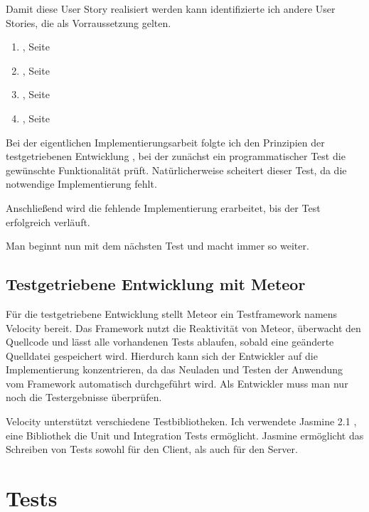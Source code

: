 Damit diese User Story realisiert werden kann identifizierte ich andere User
Stories, die als Vorraussetzung gelten.

\begin{enumerate}
  \item{, Seite \pageref{ch:SystemEntwurf:03}}
  \item{, Seite \pageref{ch:SystemEntwurf:04}}
  \item{, Seite \pageref{ch:SystemEntwurf:05}}
  \item{, Seite \pageref{ch:SystemEntwurf:06}}
\end{enumerate}

Bei der eigentlichen Implementierungsarbeit folgte ich den Prinzipien der
testgetriebenen Entwicklung \cite{tdd}, bei der zunächst ein programmatischer
Test die gewünschte Funktionalität prüft. Natürlicherweise scheitert dieser
Test, da die notwendige Implementierung fehlt.

Anschließend wird die fehlende Implementierung erarbeitet, bis der Test
erfolgreich verläuft.

Man beginnt nun mit dem nächsten Test und macht immer so weiter.

\subsection{Testgetriebene Entwicklung mit Meteor}

Für die testgetriebene Entwicklung stellt Meteor ein Testframework namens
Velocity \cite{velocity} bereit. Das Framework nutzt die Reaktivität von Meteor,
überwacht den Quellcode und lässt alle vorhandenen Tests ablaufen, sobald eine
geänderte Quelldatei gespeichert wird. Hierdurch kann sich der Entwickler auf
die Implementierung konzentrieren, da das Neuladen und Testen der Anwendung vom
Framework automatisch durchgeführt wird. Als Entwickler muss man nur noch die
Testergebnisse überprüfen.

Velocity unterstützt verschiedene Testbibliotheken. Ich verwendete Jasmine 2.1
\cite{jasmine}, eine Bibliothek die Unit und Integration Tests ermöglicht.
Jasmine ermöglicht das Schreiben von Tests sowohl für den Client, als auch für
den Server.

\section{Tests}

